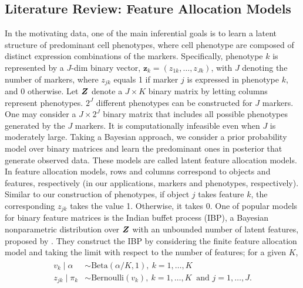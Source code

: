 \documentclass[12pt,]{article}
\newcommand{\bZ}{\mbox{\boldmath $Z$}}
\begin{document}
\subsection{Literature Review: Feature Allocation Models}\label{literature-review}
In the motivating data, one of the main inferential goals is  to learn a latent
structure of predominant cell phenotypes, where cell phenotype are composed of
distinct expression combinations of the markers. Specifically, phenotype $k$ is
represented by a $J$-dim binary vector, $\bm z_k=(z_{1k}, \ldots, z_{Jk})$,
with $J$ denoting the number of markers, where $z_{jk}$ equals 1 if marker $j$
is expressed in phenotype $k$, and 0 otherwise.  Let $\bZ$ denote a $J \times
K$ binary matrix by letting columns represent phenotypes.  \(2^J\) different
phenotypes can be constructed for \(J\) markers.  One may consider a \(J \times
2^J\) binary matrix that includes all possible phenotypes generated by the
\(J\) markers. It is computationally infeasible even when \(J\) is moderately
large. Taking a Bayesian approach, we consider a prior probability model over
binary matrices
and learn the predominant ones in posterior that  generate observed data.
These models are called latent feature allocation models. In feature allocation
models, rows and columns correspond to objects and features, respectively (in
our applications, markers and phenotypes, respectively). Similar to our
construction of phenotypes, if object $j$ takes feature $k$, the corresponding
$z_{jk}$ takes the value 1. Otherwise, it takes 0.  One of popular models for
binary feature matrices is the Indian buffet process (IBP), a Bayesian
nonparametric distribution over $\bZ$ with an unbounded number of latent
features, proposed by \citet{griffiths2011indian}. 
They construct the IBP by considering the finite feature allocation
model and taking the limit with respect to the number of features; for a given
$K$,
\begin{align}
\begin{split}
v_k \mid \alpha &\sim \text{Beta}(\alpha/K, 1),~ k=1, \ldots, K \\
z_{jk} \mid \pi_k &\sim \text{Bernoulli}(v_k),~ k=1, \ldots, K~\mbox{ and } j=1, \ldots, J. \\
\end{split}
\label{eq:ibp}
\end{align}
\end{document}

